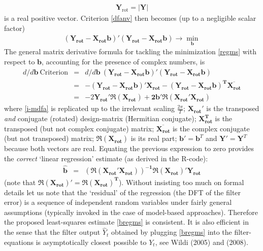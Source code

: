 \documentclass[11pt]{article}
\begin{document}
\begin{eqnarray*}
 \mathbf{Y}_{\textrm{rot}}=\left|\mathbf{Y}\right|
\end{eqnarray*}
is a real positive vector. Criterion  \ref{dfanv} then becomes (up to a negligible scalar factor)
\begin{eqnarray}\label{regms}
(\mathbf{Y_{\textrm{rot}}-X_{\textrm{rot}}b})'(\mathbf{Y_{\textrm{rot}}-X_{\textrm{rot}}b})\to\min_{\mathbf{b}}
\end{eqnarray}
The general matrix derivative formula for tackling the minimization \ref{regms} with respect to $\mathbf{b}$, accounting for the presence of complex numbers, is
\begin{eqnarray*}
d/d\mathbf{b}~\textrm{Criterion}&=&d/d\mathbf{b}~ (\mathbf{Y_{\textrm{rot}}-X_{\textrm{rot}}b})'(\mathbf{Y_{\textrm{rot}}-X_{\textrm{rot}}b})\\
&=&-\mathbf{(Y_{\textrm{rot}}-X_{\textrm{rot}}b)'X_{\textrm{rot}}}-\mathbf{(Y_{\textrm{rot}}-X_{\textrm{rot}}b)^T\overline{X_{\textrm{rot}}}}\\
&=&-2\mathbf{Y_{\textrm{rot}}'\Re\left(X_{\textrm{rot}}\right)+2b'\Re(X_{\textrm{rot}}'X_{\textrm{rot}})}
\end{eqnarray*}
where  \ref{i-mdfa} is replicated up to the irrelevant scaling $\frac{2\pi}{T}$; $\mathbf{X_{\textrm{rot}}}'$ is the transposed \emph{and} conjugate (rotated) design-matrix (Hermitian conjugate); $\mathbf{X_{\textrm{rot}}^T}$ is the transposed (but not complex conjugate) matrix; $\overline{\mathbf{X_{\textrm{rot}}}}$ is the complex conjugate (but not transposed) matrix;   $\Re\left(\mathbf{X_{\textrm{rot}}}\right)$ is its real part; $\mathbf{b}'=\mathbf{b}^T$ and $\mathbf{Y}'=\mathbf{Y}^T$ because both vectors are real. Equating the previous expression to zero provides the \emph{correct} `linear regression' estimate (as derived in the R-code):
\begin{eqnarray}\label{bregms}
\mathbf{\hat{b}}&=&\mathbf{\left(\Re(X_{\textrm{rot}}'X_{\textrm{rot}})\right)^{-1}\Re(X_{\textrm{rot}})'Y_{\textrm{rot}}}
\end{eqnarray}
(note that $\mathbf{\Re(X_{\textrm{rot}})'=\Re(X_{\textrm{rot}})^T}$). Without insisting too much on formal details let us note that the `residual' of the regression (the DFT of the filter error) is a sequence of independent random variables under fairly general assumptions (typically invoked in the case of model-based approaches). Therefore the proposed least-squares estimate \ref{bregms} is consistent. It is also efficient in the sense that the filter output $\hat{Y}_t$ obtained by plugging \ref{bregms} into the filter-equations is asymptotically closest possible to $Y_t$, see Wildi (2005) and (2008).
\end{document}
